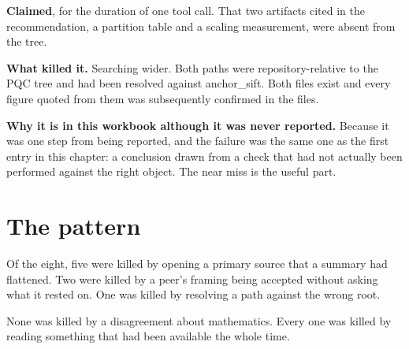 \textbf{Claimed}, for the duration of one tool call. That two artifacts cited in the recommendation,
a partition table and a scaling measurement, were absent from the tree.

\textbf{What killed it.} Searching wider. Both paths were repository-relative to the PQC tree and
had been resolved against anchor\_sift. Both files exist and every figure quoted from them was
subsequently confirmed in the files.

\textbf{Why it is in this workbook although it was never reported.} Because it was one step from
being reported, and the failure was the same one as the first entry in this chapter: a conclusion
drawn from a check that had not actually been performed against the right object. The near miss is
the useful part.

\section{The pattern}

Of the eight, five were killed by opening a primary source that a summary had flattened. Two were
killed by a peer's framing being accepted without asking what it rested on. One was killed by
resolving a path against the wrong root.

None was killed by a disagreement about mathematics. Every one was killed by reading something that
had been available the whole time.
